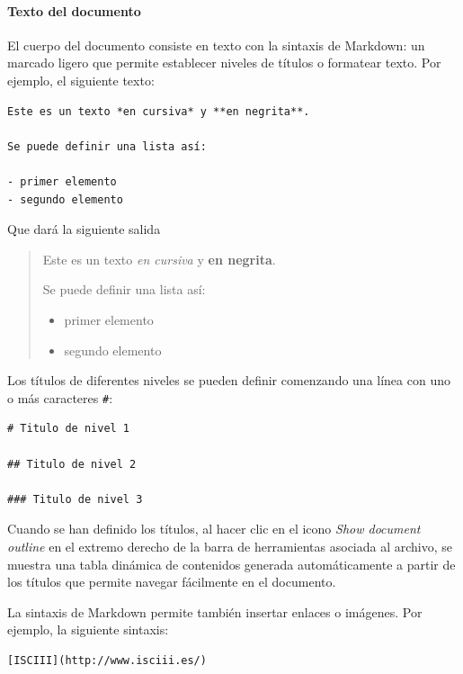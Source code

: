 \documentclass[]{article}
\providecommand{\tightlist}{%
  \setlength{\itemsep}{0pt}\setlength{\parskip}{0pt}}
\let\oldparagraph\paragraph
\renewcommand{\paragraph}[1]{\oldparagraph{#1}\mbox{}}
\numberwithin{ejcnt}{section}
\begin{document}
\hypertarget{texto-del-documento}{%
\paragraph{Texto del documento}\label{texto-del-documento}}

El cuerpo del documento consiste en texto con la sintaxis de Markdown: un marcado ligero que permite establecer niveles de títulos o formatear texto. Por ejemplo, el siguiente texto:

\begin{verbatim}
Este es un texto *en cursiva* y **en negrita**.

Se puede definir una lista así:

- primer elemento
- segundo elemento
\end{verbatim}

Que dará la siguiente salida

\begin{quote}
Este es un texto \emph{en cursiva} y \textbf{en negrita}.

Se puede definir una lista así:

\begin{itemize}
\tightlist
\item
  primer elemento
\item
  segundo elemento
\end{itemize}
\end{quote}

Los títulos de diferentes niveles se pueden definir comenzando una línea con uno o más caracteres \texttt{\#}:

\begin{verbatim}
# Titulo de nivel 1

## Titulo de nivel 2

### Titulo de nivel 3
\end{verbatim}

Cuando se han definido los títulos, al hacer clic en el icono \emph{Show document outline} en el extremo derecho de la barra de herramientas asociada al archivo, se muestra una tabla dinámica de contenidos generada automáticamente a partir de los títulos que permite navegar fácilmente en el documento.

La sintaxis de Markdown permite también insertar enlaces o imágenes. Por ejemplo, la siguiente sintaxis:

\begin{verbatim}
[ISCIII](http://www.isciii.es/)
\end{verbatim}
\end{document}
